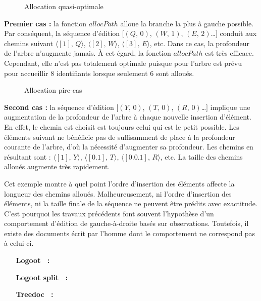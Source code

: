 \begin{wrapfigure}{r}{0.5\textwidth}
  \vspace{-15pt}
  \centering
  
  \caption{\label{repl:fig:allocpathexampleA}Allocation quasi-optimale}
  \vspace{-15pt}
\end{wrapfigure}

\textbf{Premier cas :} la fonction $allocPath$ alloue la branche la plus à
gauche possible. Par conséquent, la séquence d'édition $[(Q,\,0)$, $(W,\,1)$,
$(E,\,2)$\ldots$]$ conduit aux chemins suivant $\langle [1],\,Q\rangle$,
$\langle [2],\, W \rangle$, $\langle [3],\, E\rangle$, etc. Dans ce cas, la
profondeur de l'arbre n'augmente jamais. À cet égard, la fonction $allocPath$
est très efficace. Cependant, elle n'est pas totalement optimale puisque pour
l'arbre est prévu pour accueillir 8 identifiants lorsque seulement 6 sont
alloués.

\begin{wrapfigure}{r}{0.5\textwidth}
  \vspace{-15pt}
  \centering
  
  \caption{\label{repl:fig:allocpathexampleB}Allocation pire-cas}
  \vspace{-20pt}
\end{wrapfigure}


\textbf{Second cas :} la séquence d'édition $[(Y,\,0)$, $(T,\,0)$,
$(R,\,0)$\ldots$]$ implique une augmentation de la profondeur de l'arbre à
chaque nouvelle insertion d'élément. En effet, le chemin est choisit est
toujours celui qui est le petit possible. Les éléments suivant ne bénéficie pas
de suffisamment de place à la profondeur courante de l'arbre, d'où la nécessité
d'augmenter sa profondeur. Les chemins en résultant sont :
$\langle [1],\, Y\rangle$, $\langle[0.1],\,T\rangle$,
$\langle[0.0.1],\, R\rangle$, etc. La taille des chemins alloués augmente très
rapidement.

Cet exemple montre à quel point l'ordre d'insertion des éléments affecte la
longueur des chemins alloués. Malheureusement, ni l'ordre d'insertion des
éléments, ni la taille finale de la séquence ne peuvent être prédits avec
exactitude. C'est pourquoi les travaux précédents font souvent l'hypothèse d'un
comportement d'édition de gauche-à-droite basés sur observations. Toutefois, il
existe des documents écrit par l'homme dont le comportement ne correspond pas à
celui-ci.

\begin{itemize}
\item [\textbf{Logoot~\cite{weiss2009logoot, weiss2010logootundo} :}]
\item [\textbf{Logoot split~\cite{mehdi2014merging} :}]
\item [\textbf{Treedoc~\cite{shapiro2011comprehensive} :}]
\end{itemize}


